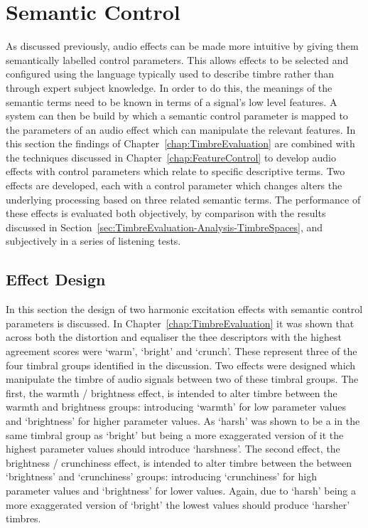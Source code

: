 \section{Semantic Control}
\label{sec:PerceptualExperiments-SemanticControl}
	As discussed previously, audio effects can be made more intuitive by giving them semantically labelled control
	parameters. This allows effects to be selected and configured using the language typically used to describe timbre
	rather than through expert subject knowledge. In order to do this, the meanings of the semantic terms need to be
	known in terms of a signal's low level features. A system can then be build by which a semantic control parameter
	is mapped to the parameters of an audio effect which can manipulate the relevant features. In this section the
	findings of Chapter~\ref{chap:TimbreEvaluation} are combined with the techniques discussed in
	Chapter~\ref{chap:FeatureControl} to develop audio effects with control parameters which relate to specific
	descriptive terms. Two effects are developed, each with a control parameter which changes alters the underlying
	processing based on three related semantic terms. The performance of these effects is evaluated both objectively,
	by comparison with the results discussed in Section~\ref{sec:TimbreEvaluation-Analysis-TimbreSpaces}, and
	subjectively in a series of listening tests.

	\subsection{Effect Design}
	\label{sec:PerceptualExperiments-SemanticControl-EffectDesign}
		In this section the design of two harmonic excitation effects with semantic control parameters is
		discussed. In Chapter~\ref{chap:TimbreEvaluation} it was shown that across both the distortion and
		equaliser the thee descriptors with the highest agreement scores were `warm', `bright' and `crunch'. These
		represent three of the four timbral groups identified in the discussion. Two effects were designed which
		manipulate the timbre of audio signals between two of these timbral groups. The first, the warmth /
		brightness effect, is intended to alter timbre between the warmth and brightness groups: introducing
		`warmth' for low parameter values and `brightness' for higher parameter values. As `harsh' was shown to be
		a in the same timbral group as `bright' but being a more exaggerated version of it the highest parameter
		values should introduce `harshness'. The second effect, the brightness / crunchiness effect, is intended to
		alter timbre between the between `brightness' and `crunchiness' groups: introducing `crunchiness' for high
		parameter values and `brightness' for lower values. Again, due to `harsh' being a more exaggerated version
		of `bright' the lowest values should produce `harsher' timbres.

